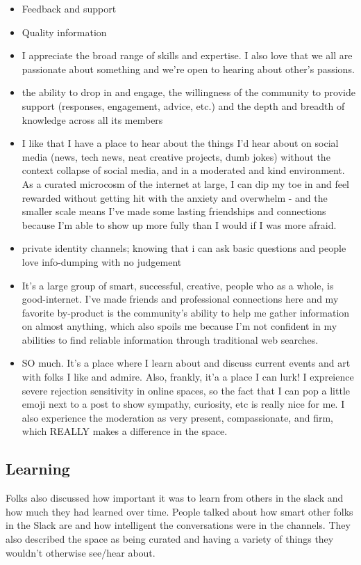 \documentclass[
]{book}
\begin{document}
\begin{itemize}
\item
  Feedback and support
\item
  Quality information
\item
  I appreciate the broad range of skills and expertise. I also love that we all are passionate about something and we're open to hearing about other's passions.
\item
  the ability to drop in and engage, the willingness of the community to provide support (responses, engagement, advice, etc.) and the depth and breadth of knowledge across all its members
\item
  I like that I have a place to hear about the things I'd hear about on social media (news, tech news, neat creative projects, dumb jokes) without the context collapse of social media, and in a moderated and kind environment. As a curated microcosm of the internet at large, I can dip my toe in and feel rewarded without getting hit with the anxiety and overwhelm - and the smaller scale means I've made some lasting friendships and connections because I'm able to show up more fully than I would if I was more afraid.
\item
  private identity channels; knowing that i can ask basic questions and people love info-dumping with no judgement
\item
  It's a large group of smart, successful, creative, people who as a whole, is good-internet. I've made friends and professional connections here and my favorite by-product is the community's ability to help me gather information on almost anything, which also spoils me because I'm not confident in my abilities to find reliable information through traditional web searches.
\item
  SO much. It's a place where I learn about and discuss current events and art with folks I like and admire. Also, frankly, it'a a place I can lurk! I expreience severe rejection sensitivity in online spaces, so the fact that I can pop a little emoji next to a post to show sympathy, curiosity, etc is really nice for me. I also experience the moderation as very present, compassionate, and firm, which REALLY makes a difference in the space.
\end{itemize}

\subsection{Learning}\label{learning}

Folks also discussed how important it was to learn from others in the slack and how much they had learned over time. People talked about how smart other folks in the Slack are and how intelligent the conversations were in the channels. They also described the space as being curated and having a variety of things they wouldn't otherwise see/hear about.
\end{document}
